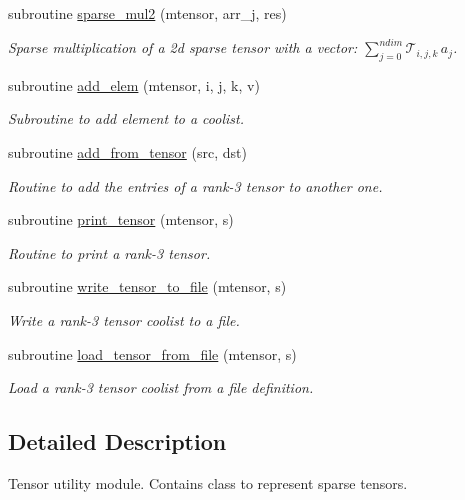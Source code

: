 \begin{DoxyCompactItemize}
subroutine \hyperlink{namespacetensor__def_a71cbdf082bb9e4661e5568b4bf7606ff}{sparse\+\_\+mul2} (mtensor, arr\+\_\+j, res)
\begin{DoxyCompactList}\small\item\em Sparse multiplication of a 2d sparse tensor with a vector\+: ${\displaystyle \sum_{j=0}^{ndim}} \mathcal{T}_{i,j,k} \, a_j $. \end{DoxyCompactList}\item 
subroutine \hyperlink{namespacetensor__def_aaea5186b8b83264be2a539c0c67d0711}{add\+\_\+elem} (mtensor, i, j, k, v)
\begin{DoxyCompactList}\small\item\em Subroutine to add element to a coolist. \end{DoxyCompactList}\item 
subroutine \hyperlink{namespacetensor__def_ac262d3198b5af39310aaf35219489037}{add\+\_\+from\+\_\+tensor} (src, dst)
\begin{DoxyCompactList}\small\item\em Routine to add the entries of a rank-\/3 tensor to another one. \end{DoxyCompactList}\item 
subroutine \hyperlink{namespacetensor__def_a45166fa9f93ed0223c38c38231650e40}{print\+\_\+tensor} (mtensor, s)
\begin{DoxyCompactList}\small\item\em Routine to print a rank-\/3 tensor. \end{DoxyCompactList}\item 
subroutine \hyperlink{namespacetensor__def_a711a4192fe0e7266f20220c7393d1715}{write\+\_\+tensor\+\_\+to\+\_\+file} (mtensor, s)
\begin{DoxyCompactList}\small\item\em Write a rank-\/3 tensor coolist to a file. \end{DoxyCompactList}\item 
subroutine \hyperlink{namespacetensor__def_a5b0b21c7d1fa8232c32167923ec9dac6}{load\+\_\+tensor\+\_\+from\+\_\+file} (mtensor, s)
\begin{DoxyCompactList}\small\item\em Load a rank-\/3 tensor coolist from a file definition. \end{DoxyCompactList}\end{DoxyCompactItemize}


\subsection{Detailed Description}
Tensor utility module. Contains class to represent sparse tensors. 

